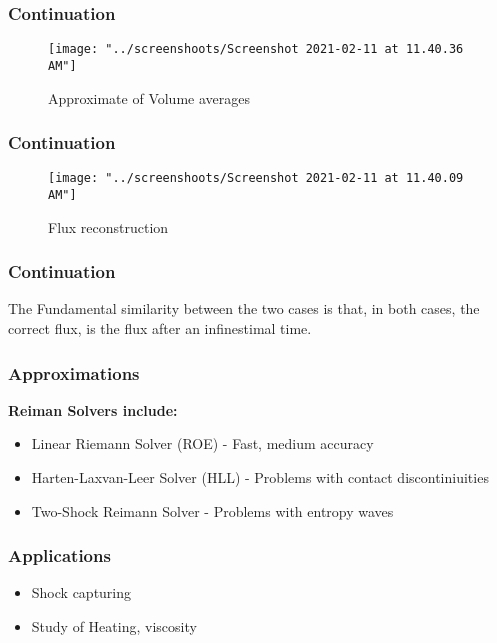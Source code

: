 \documentclass[12pt]{beamer}
\begin{document}
\begin{frame}
	\frametitle{Continuation}
	\begin{figure}
		\centering
		\texttt{[image: "../screenshoots/Screenshot 2021-02-11 at 11.40.36 AM"]}
		\caption{Approximate of Volume averages}
		\label{fig:screenshot-2021-02-11-at-11}
	\end{figure}
	
\end{frame}

\begin{frame}
	\frametitle{Continuation}
	\begin{figure}
		\centering
		\texttt{[image: "../screenshoots/Screenshot 2021-02-11 at 11.40.09 AM"]}
		\caption{Flux reconstruction}
		\label{fig:screenshot-2021-02-11-at-11}
	\end{figure}
	
\end{frame}

\begin{frame}
	\frametitle{Continuation}
	The Fundamental similarity between the two cases is that, in both cases, the correct flux, is the flux after an infinestimal time.
\end{frame}
\begin{frame}
	\frametitle{Approximations}
	
	\textbf{Reiman Solvers include:}
	\begin{itemize}
		\item Linear Riemann Solver  (ROE) - Fast, medium accuracy
		\item Harten-Laxvan-Leer Solver (HLL)  - Problems with contact discontiniuities
		\item  Two-Shock Reimann Solver - Problems with entropy waves
	\end{itemize}
\end{frame}

	

\begin{frame}
	\frametitle{Applications}
	\begin{itemize}
		\item Shock capturing
		\item Study of Heating, viscosity
	\end{itemize}
	
\end{frame}
\end{document}

